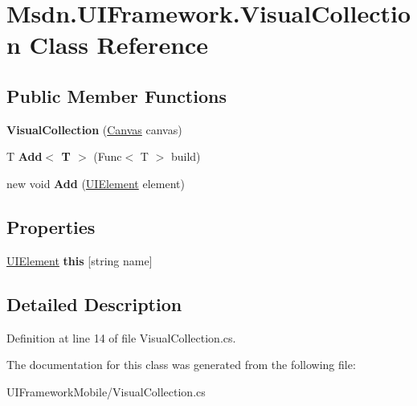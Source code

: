 \hypertarget{class_msdn_1_1_u_i_framework_1_1_visual_collection}{
\section{Msdn.UIFramework.VisualCollection Class Reference}
\label{class_msdn_1_1_u_i_framework_1_1_visual_collection}
}
\subsection*{Public Member Functions}
\begin{DoxyCompactItemize}
\item 
\hypertarget{class_msdn_1_1_u_i_framework_1_1_visual_collection_a977ddf085c2a76dae56e2f4f40c5bd35}{
{\bfseries VisualCollection} (\hyperlink{class_msdn_1_1_u_i_framework_1_1_canvas}{Canvas} canvas)}
\label{class_msdn_1_1_u_i_framework_1_1_visual_collection_a977ddf085c2a76dae56e2f4f40c5bd35}

\item 
\hypertarget{class_msdn_1_1_u_i_framework_1_1_visual_collection_a249bf3c146c751ac4b7218b4a8acd507}{
T {\bfseries Add$<$ T $>$} (Func$<$ T $>$ build)}
\label{class_msdn_1_1_u_i_framework_1_1_visual_collection_a249bf3c146c751ac4b7218b4a8acd507}

\item 
\hypertarget{class_msdn_1_1_u_i_framework_1_1_visual_collection_ac36bf3c712a033335f00b5f33239f755}{
new void {\bfseries Add} (\hyperlink{class_msdn_1_1_u_i_framework_1_1_u_i_element}{UIElement} element)}
\label{class_msdn_1_1_u_i_framework_1_1_visual_collection_ac36bf3c712a033335f00b5f33239f755}

\end{DoxyCompactItemize}
\subsection*{Properties}
\begin{DoxyCompactItemize}
\item 
\hypertarget{class_msdn_1_1_u_i_framework_1_1_visual_collection_a188ea7dcf58038007618708a00e30e10}{
\hyperlink{class_msdn_1_1_u_i_framework_1_1_u_i_element}{UIElement} {\bfseries this} \mbox{[}string name\mbox{]}}
\label{class_msdn_1_1_u_i_framework_1_1_visual_collection_a188ea7dcf58038007618708a00e30e10}

\end{DoxyCompactItemize}


\subsection{Detailed Description}


Definition at line 14 of file VisualCollection.cs.

The documentation for this class was generated from the following file:\begin{DoxyCompactItemize}
\item 
UIFrameworkMobile/VisualCollection.cs\end{DoxyCompactItemize}
